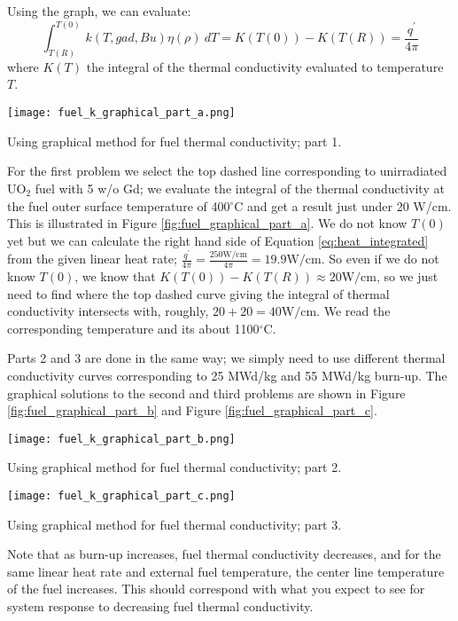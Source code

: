 Using the graph, we can evaluate:
\begin{equation}
\int_{T(R)}^{T(0)} k(T,gad,Bu)\eta(\rho) \ dT = K(T(0)) - K(T(R)) = \frac{q^{\prime}}{4 \pi}
\label{eq:heat_integrated}
\end{equation}
where $K(T)$ the integral of the thermal conductivity evaluated to temperature $T$.

\begin{marginfigure}
\texttt{[image: fuel\_k\_graphical\_part\_a.png]}
\caption{Using graphical method for fuel thermal conductivity; part 1.}
\label{fig:fuel_graphical_part_a}
\end{marginfigure}
For the first problem we select the top dashed line corresponding to unirradiated UO$_2$ fuel with 5 w/o Gd; we evaluate the integral of the thermal conductivity at the fuel outer surface temperature of 400$^{\circ}$C and get a result just under 20 W/cm.  This is illustrated in Figure \ref{fig:fuel_graphical_part_a}.  We do not know $T(0)$ yet but we can calculate the right hand side of Equation \ref{eq:heat_integrated} from the given linear heat rate; $\frac{q^{\prime}}{4 \pi} = \frac{250 \text{W/cm}}{4 \pi} = 19.9 \text{W/cm}$. So even if we do not know $T(0)$, we know that $K(T(0)) - K(T(R)) \approx 20 \text{W/cm}$, so we just need to find where the top dashed curve giving the integral of thermal conductivity intersects with, roughly, $20 + 20 = 40 \text{W/cm}$.  We read the corresponding temperature and its about 1100$^{\circ}$C.

Parts 2 and 3 are done in the same way; we simply need to use different thermal conductivity curves corresponding to 25 MWd/kg and 55 MWd/kg burn-up. The graphical solutions to the second and third problems are shown in Figure \ref{fig:fuel_graphical_part_b} and Figure \ref{fig:fuel_graphical_part_c}.

\begin{marginfigure}
\texttt{[image: fuel\_k\_graphical\_part\_b.png]}
\caption{Using graphical method for fuel thermal conductivity; part 2.}
\label{fig:fuel_graphical_part_b}
\end{marginfigure}

\begin{marginfigure}
\texttt{[image: fuel\_k\_graphical\_part\_c.png]}
\caption{Using graphical method for fuel thermal conductivity; part 3.}
\label{fig:fuel_graphical_part_c}
\end{marginfigure}
Note that as burn-up increases, fuel thermal conductivity decreases, and for the same linear heat rate and external fuel temperature, the center line temperature of the fuel increases.  This should correspond with what you expect to see for system response to decreasing fuel thermal conductivity.

